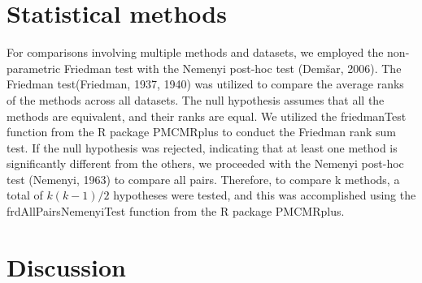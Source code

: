 \section{Statistical methods}
For comparisons involving multiple methods and datasets, we employed the non-parametric Friedman test with the Nemenyi post-hoc test (Demšar, 2006). The Friedman test(Friedman, 1937, 1940) was utilized to compare the average ranks of the methods across all datasets. The null hypothesis assumes that all the methods are equivalent, and their ranks are equal. We utilized the friedmanTest function from the R package PMCMRplus to conduct the Friedman rank sum test. If the null hypothesis was rejected, indicating that at least one method is significantly different from the others, we proceeded with the Nemenyi post-hoc test (Nemenyi, 1963) to compare all pairs. Therefore, to compare k methods, a total of $k(k-1)/2$ hypotheses were tested, and this was accomplished using the frdAllPairsNemenyiTest function from the R package PMCMRplus.


\section{Discussion}



